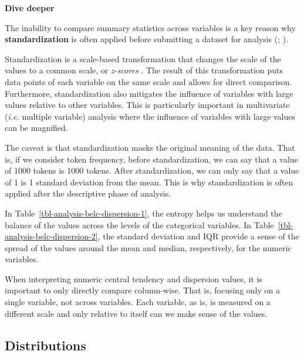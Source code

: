 \documentclass[
  letterpaper,
  krantz1]{latex/krantz-mod}
\theoremstyle{definition}
\theoremstyle{definition}
\theoremstyle{remark}
\begin{document}
\begin{tcolorbox}[enhanced jigsaw, toprule=.15mm, breakable, colback=white, arc=.35mm, left=2mm, colframe=quarto-callout-color-frame, opacityback=0, bottomrule=.15mm, rightrule=.15mm, leftrule=.75mm]

\textbf{ Dive deeper}

The inability to compare summary statistics across variables is a key
reason why \textbf{standardization}  is often
applied before submitting a dataset for analysis
(;
).

Standardization is a scale-based transformation that changes the scale
of the values to a common scale, or \emph{z-scores} . The
result of this transformation puts data points of each variable on the
same scale and allows for direct comparison. Furthermore,
standardization also mitigates the influence of variables with large
values relative to other variables. This is particularly important in
multivariate (\emph{i.e.} multiple variable) analysis
 where the influence of variables with
large values can be magnified.

The caveat is that standardization masks the original meaning of the
data. That is, if we consider token frequency, before
standardization, we can say that a value of 1000 tokens is 1000 tokens.
After standardization, we can only say that a value of 1 is 1 standard
deviation from the mean. This is why standardization is often applied
after the descriptive phase of analysis.

\end{tcolorbox}

In Table~\ref{tbl-analysis-belc-dispersion-1}, the
entropy helps us understand the balance of the values
across the levels of the categorical
variables. In
Table~\ref{tbl-analysis-belc-dispersion-2}, the standard deviation and
IQR provide a sense of the spread of the values around the mean and
median, respectively, for the numeric variables.

When interpreting numeric central tendency and dispersion values, it is
important to only directly compare column-wise. That is, focusing only
on a single variable, not across variables. Each variable, as is, is
measured on a different scale and only relative to itself can we make
sense of the values.

\subsection{Distributions}\label{sec-analysis-distributions}
\end{document}
